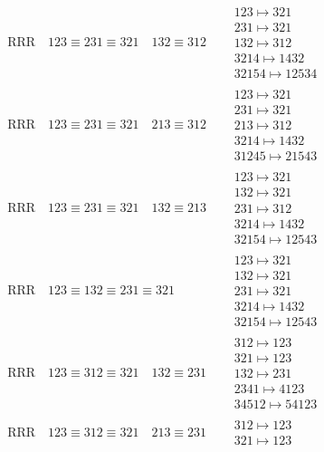\documentclass{article}
\begin{document}
\begin{align}
\\
\text{RRR}
\quad
123\equiv231\equiv321
\quad
132\equiv312
\quad
&
\begin{matrix}
123 \mapsto 321
\\
231 \mapsto 321
\\
132 \mapsto 312
\\
3214 \mapsto 1432
\\
32154 \mapsto 12534
\end{matrix}
\\
\text{RRR}
\quad
123\equiv231\equiv321
\quad
213\equiv312
\quad
&
\begin{matrix}
123 \mapsto 321
\\
231 \mapsto 321
\\
213 \mapsto 312
\\
3214 \mapsto 1432
\\
31245 \mapsto 21543
\end{matrix}
\\
\text{RRR}
\quad
123\equiv231\equiv321
\quad
132\equiv213
\quad
&
\begin{matrix}
123 \mapsto 321
\\
132 \mapsto 321
\\
231 \mapsto 312
\\
3214 \mapsto 1432
\\
32154 \mapsto 12543
\end{matrix}
\\
\text{RRR}
\quad
123\equiv132\equiv231\equiv321
\quad
&
\begin{matrix}
123 \mapsto 321
\\
132 \mapsto 321
\\
231 \mapsto 321
\\
3214 \mapsto 1432
\\
32154 \mapsto 12543
\end{matrix}
\\
\text{RRR}
\quad
123\equiv312\equiv321
\quad
132\equiv231
\quad
&
\begin{matrix}
312 \mapsto 123
\\
321 \mapsto 123
\\
132 \mapsto 231
\\
2341 \mapsto 4123
\\
34512 \mapsto 54123
\end{matrix}
\\
\text{RRR}
\quad
123\equiv312\equiv321
\quad
213\equiv231
\quad
&
\begin{matrix}
312 \mapsto 123
\\
321 \mapsto 123

\end{matrix}
\end{align}
\end{document}
